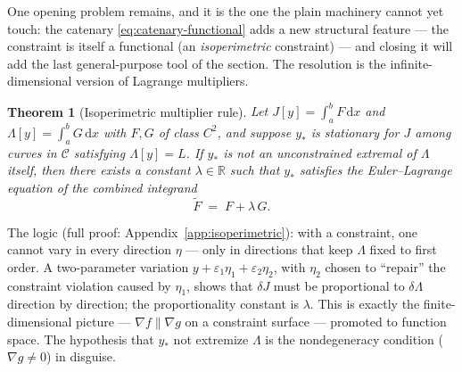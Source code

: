 \documentclass[11pt]{article}
\theoremstyle{plain}
\newtheorem{theorem}{Theorem}[section]
\theoremstyle{definition}
\theoremstyle{remark}
\newcommand{\dd}{\mathrm{d}}
\newcommand{\R}{\mathbb{R}}
\begin{document}
One opening problem remains, and it is the one the plain machinery
cannot yet touch: the catenary \eqref{eq:catenary-functional} adds a new
structural feature ---
the constraint is itself a functional (an \emph{isoperimetric}
constraint) --- and closing it will add the last general-purpose tool of
the section.
The resolution is the infinite-dimensional version of Lagrange multipliers.

\begin{theorem}[Isoperimetric multiplier rule]\label{thm:isoperimetric}
Let $J[y] = \int_a^b F\,\dd x$ and $\Lambda[y] = \int_a^b G\,\dd x$ with
$F, G$ of class $C^2$, and suppose $y_\ast$ is stationary for $J$ among
curves in $\mathcal C$ satisfying $\Lambda[y] = L$. If $y_\ast$ is
\emph{not} an unconstrained extremal of $\Lambda$ itself, then there
exists a constant $\lambda \in \R$ such that $y_\ast$ satisfies the
Euler--Lagrange equation of the \emph{combined} integrand
\begin{equation}
  \widetilde F \;=\; F + \lambda\, G .
\end{equation}
\end{theorem}

The logic (full proof: Appendix~\ref{app:isoperimetric}): with a
constraint, one cannot vary in every direction $\eta$ --- only in
directions that keep $\Lambda$ fixed to first order. A two-parameter
variation $y + \varepsilon_1\eta_1 + \varepsilon_2\eta_2$, with $\eta_2$
chosen to ``repair'' the constraint violation caused by $\eta_1$, shows
that $\delta J$ must be proportional to $\delta\Lambda$ direction by
direction; the proportionality constant is $\lambda$. This is exactly the
finite-dimensional picture --- $\nabla f \parallel \nabla g$ on a
constraint surface --- promoted to function space. The hypothesis that
$y_\ast$ not extremize $\Lambda$ is the nondegeneracy condition
($\nabla g \neq 0$) in disguise.
\end{document}

